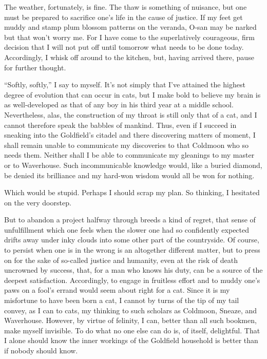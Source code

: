 \documentclass[12pt, openright]{book}
\begin{document}
The weather, fortunately, is fine. The thaw is something of nuisance,
but one must be prepared to sacrifice one's life in the cause of
justice. If my feet get muddy and stamp plum blossom patterns on the
veranda, O-san may be narked but that won't worry me. For I have come to
the superlatively courageous, firm decision that I will not put off
until tomorrow what needs to be done today. Accordingly, I whisk off
around to the kitchen, but, having arrived there, pause for further
thought.

``Softly, softly,'' I say to myself. It's not simply that I've attained
the highest degree of evolution that can occur in cats, but I make bold
to believe my brain is as well-developed as that of any boy in his third
year at a middle school. Nevertheless, alas, the construction of my
throat is still only that of a cat, and I cannot therefore speak the
babbles of mankind. Thus, even if I succeed in sneaking into the
Goldfield's citadel and there discovering matters of moment, I shall
remain unable to communicate my discoveries to that Coldmoon who so
needs them. Neither shall I be able to communicate my gleanings to my
master or to Waverhouse. Such incommunicable knowledge would, like a
buried diamond, be denied its brilliance and my hard-won wisdom would
all be won for nothing.

Which would be stupid. Perhaps I should scrap my plan. So thinking, I
hesitated on the very doorstep.

But to abandon a project halfway through breeds a kind of regret, that
sense of unfulfillment which one feels when the slower one had so
confidently expected drifts away under inky clouds into some other part
of the countryside. Of course, to persist when one is in the wrong is an
altogether different matter, but to press on for the sake of so-called
justice and humanity, even at the risk of death uncrowned by success,
that, for a man who knows his duty, can be a source of the deepest
satisfaction. Accordingly, to engage in fruitless effort and to muddy
one's paws on a fool's errand would seem about right for a cat. Since it
is my misfortune to have been born a cat, I cannot by turns of the tip
of my tail convey, as I can to cats, my thinking to such scholars as
Coldmoon, Sneaze, and Waverhouse. However, by virtue of felinity, I can,
better than all such bookmen, make myself invisible. To do what no one
else can do is, of itself, delightful. That I alone should know the
inner workings of the Goldfield household is better than if nobody
should know.
\end{document}
